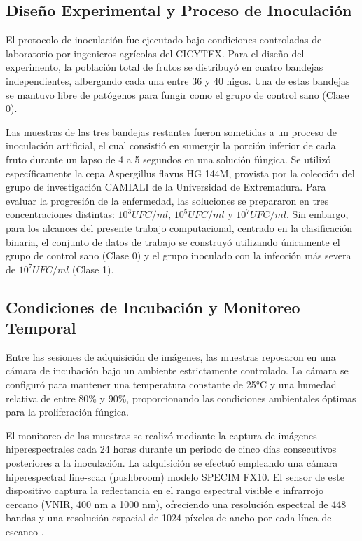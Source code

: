 \subsection{Diseño Experimental y Proceso de Inoculación}
El protocolo de inoculación fue ejecutado bajo condiciones controladas de laboratorio por ingenieros agrícolas del CICYTEX. Para el diseño del experimento, la población total de frutos se distribuyó en cuatro bandejas independientes, albergando cada una entre 36 y 40 higos. Una de estas bandejas se mantuvo libre de patógenos para fungir como el grupo de control sano (Clase 0).

Las muestras de las tres bandejas restantes fueron sometidas a un proceso de inoculación artificial, el cual consistió en sumergir la porción inferior de cada fruto durante un lapso de 4 a 5 segundos en una solución fúngica. Se utilizó específicamente la cepa Aspergillus flavus HG 144M, provista por la colección del grupo de investigación CAMIALI de la Universidad de Extremadura.
Para evaluar la progresión de la enfermedad, las soluciones se prepararon en tres concentraciones distintas: $10^3 UFC/ml$, $10^5 UFC/ml$ y $10^7 UFC/ml$. Sin embargo, para los alcances del presente trabajo computacional, centrado en la clasificación binaria, el conjunto de datos de trabajo se construyó utilizando únicamente el grupo de control sano (Clase 0) y el grupo inoculado con la infección más severa de $10^7 UFC/ml$ (Clase 1).

\subsection{Condiciones de Incubación y Monitoreo Temporal}
Entre las sesiones de adquisición de imágenes, las muestras reposaron en una cámara de incubación bajo un ambiente estrictamente controlado. La cámara se configuró para mantener una temperatura constante de 25°C y una humedad relativa de entre 80\% y 90\%, proporcionando las condiciones ambientales óptimas para la proliferación fúngica.

El monitoreo de las muestras se realizó mediante la captura de imágenes hiperespectrales cada 24 horas durante un periodo de cinco días consecutivos posteriores a la inoculación. La adquisición se efectuó empleando una cámara hiperespectral line-scan (pushbroom) modelo SPECIM FX10. El sensor de este dispositivo captura la reflectancia en el rango espectral visible e infrarrojo cercano (VNIR, 400 nm a 1000 nm), ofreciendo una resolución espectral de 448 bandas y una resolución espacial de 1024 píxeles de ancho por cada línea de escaneo \cite{cruz-carrasco_detection_2024}.

